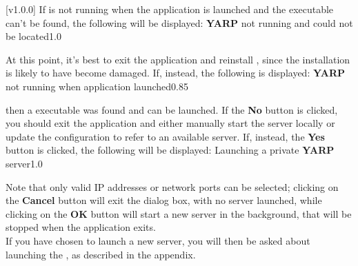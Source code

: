 [v1.0.0]
If \yarp{} is not running when the \emph{\MMMU} application is launched and the \yarp{}
executable can't be found, the following will be displayed:
%
{\textbf{YARP} not running and could not be located}{1.0}

At this point, it's best to exit the \emph{\MMMU} application and reinstall \mplusm, since
the installation is likely to have become damaged.
If, instead, the following is displayed:
%
{\textbf{YARP} not running when application launched}{0.85}

then a \yarp{} executable was found and can be launched.
If the \textbf{No} button is clicked, you should exit the \emph{\MMMU} application and
either manually start the \yarp{} server locally or update the \yarp{} configuration to
refer to an available \yarp{} server.
\condPage{}
If, instead, the \textbf{Yes} button is clicked, the following will be displayed:
%
{Launching a private \textbf{YARP} server}{1.0}

Note that only valid IP addresses or network ports can be selected; clicking on the
\textbf{Cancel} button will exit the dialog box, with no \yarp{} server launched, while
clicking on the \textbf{OK} button will start a new \yarp{} server in the background, that
will be stopped when the \emph{\MMMU} application exits.\\

If you have chosen to launch a new \yarp{} server, you will then be asked about launching
the \emph{\RS}, as described in the  appendix.
\appendixEnd{}

